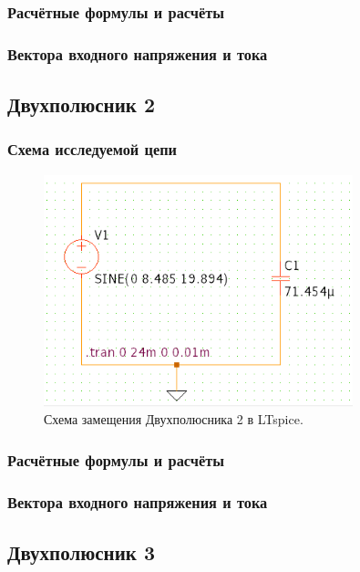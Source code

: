 \subsubsection{Расчётные формулы и расчёты}

\subsubsection{Вектора входного напряжения и тока}


\subsection{Двухполюсник 2}
\subsubsection{Схема исследуемой цепи}
\begin{figure}[H]
	\centering
	\includegraphics[width=0.8\textwidth]{./data/schema2}
	\caption{Схема замещения Двухполюсника 2 в LTspice.}
\end{figure}
\subsubsection{Расчётные формулы и расчёты}

\subsubsection{Вектора входного напряжения и тока}


\subsection{Двухполюсник 3}
